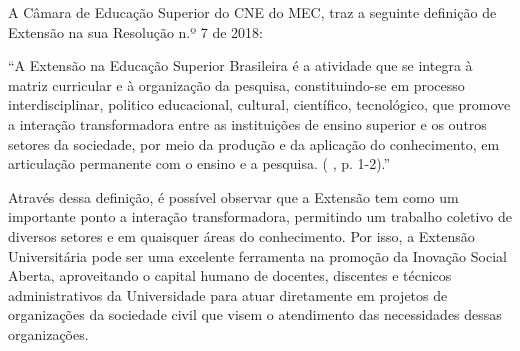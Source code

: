 A Câmara de Educação Superior do \gls{CNE} do \gls{MEC}, traz a seguinte definição de Extensão na sua Resolução n.º 7 de 2018: 
\begin{citacao}“A Extensão na Educação Superior Brasileira é a atividade que se integra à matriz curricular e à organização da pesquisa, constituindo-se em processo interdisciplinar, politico educacional, cultural, científico, tecnológico, que promove a interação transformadora entre as instituições de ensino superior e os outros setores da sociedade, por meio da produção e da aplicação do conhecimento, em articulação permanente com o ensino e a pesquisa. (\citeauthor{cne2018} \citeyear{cne2018}, p. 1-2).”
\end{citacao}

Através dessa definição, é possível observar que a Extensão tem como um importante ponto a interação transformadora, permitindo um trabalho coletivo de diversos setores e em quaisquer áreas do conhecimento. Por isso, a Extensão Universitária pode ser uma excelente ferramenta na promoção da Inovação Social Aberta, aproveitando o capital humano de docentes, discentes e técnicos administrativos da Universidade para atuar diretamente em projetos de organizações da sociedade civil que visem o atendimento das necessidades dessas organizações.
